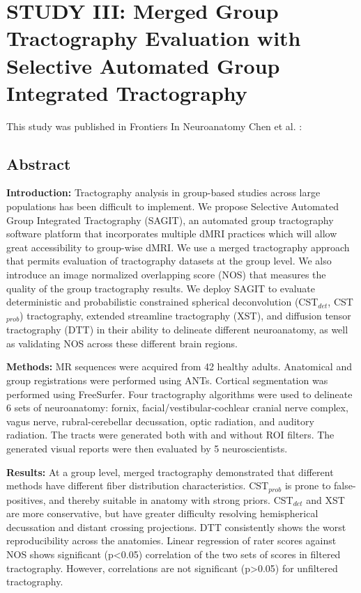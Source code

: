 \graphicspath{{images/sagit/drafts/}}

\chapter{STUDY III: Merged Group Tractography Evaluation with Selective Automated Group Integrated Tractography}

This study was published in Frontiers In Neuroanatomy  Chen et al. :


\section{Abstract }
\textbf{Introduction:} Tractography analysis in group-based studies across large populations has been difficult to implement. We propose Selective Automated Group Integrated Tractography (SAGIT), an automated group tractography software platform that incorporates multiple dMRI practices which will allow great accessibility to group-wise dMRI. We use a merged tractography approach that permits evaluation of tractography datasets at the group level.  We also introduce an image normalized overlapping score (NOS) that measures the quality of the group tractography results. We deploy SAGIT to evaluate deterministic and probabilistic constrained spherical deconvolution (CST$_{det}$, CST$_{prob}$) tractography, extended streamline tractography (XST), and diffusion tensor tractography (DTT) in their ability to delineate different neuroanatomy, as well as validating NOS across these different brain regions. 

\textbf{Methods:} MR sequences were acquired from 42 healthy adults. Anatomical and group registrations were performed using ANTs. Cortical segmentation was performed using FreeSurfer. Four tractography algorithms were used to delineate 6 sets of neuroanatomy: fornix, facial/vestibular-cochlear cranial nerve complex, vagus nerve, rubral-cerebellar decussation, optic radiation, and auditory radiation. The tracts were generated both with and without ROI filters. The generated visual reports were then evaluated by 5 neuroscientists. 

\textbf{Results:} At a group level, merged tractography demonstrated that different methods have different fiber distribution characteristics. CST$_{prob}$ is prone to false-positives, and thereby suitable in anatomy with strong priors. CST$_{det}$ and XST are more conservative, but have greater difficulty resolving hemispherical decussation and distant crossing projections. DTT consistently shows the worst reproducibility across the anatomies. Linear regression of rater scores against NOS shows significant (p\textless0.05) correlation of the two sets of scores in filtered tractography. However, correlations are not significant (p\textgreater0.05) for unfiltered tractography.

